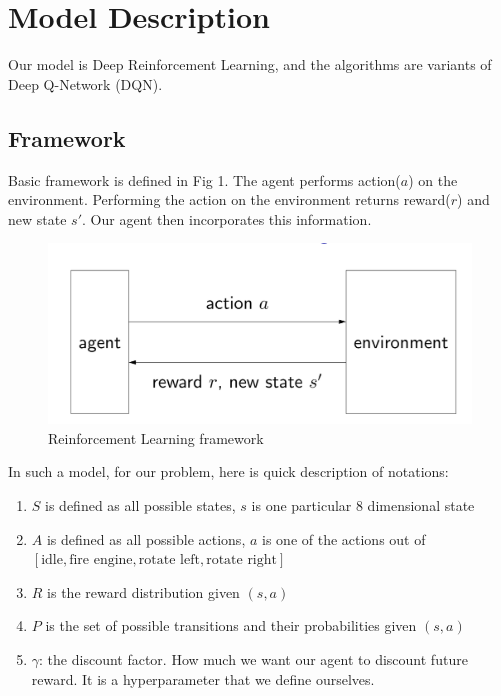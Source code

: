 \section{Model Description}
\label{sec:Model}

Our model is Deep Reinforcement Learning, and the algorithms are variants of Deep Q-Network (DQN).

\subsection{Framework}
Basic framework is defined in Fig 1. The agent performs action($a$) on the environment. Performing the action on the environment returns reward($r$) and new state $s'$. Our agent then incorporates this information.

\begin{figure}%
\centering
\includegraphics[scale=0.3]{reinforcement_framework.png}%
\caption{Reinforcement Learning framework}%
\label{fig:datastats}%
\end{figure}

In such a model, for our problem, here is quick description of notations:
\begin{enumerate}
\item $S$ is defined as all possible states, $s$ is one particular 8 dimensional state
\item $A$ is defined as all possible actions, $a$ is one of the actions out of $[\text{idle}, \text{fire engine}, \text{rotate left}, \text{rotate right}]$
\item $R$ is the reward distribution given $(s, a)$
\item $P$ is the set of possible transitions and their probabilities given $(s, a)$
\item $\gamma$: the discount factor. How much we want our agent to discount future reward. It is a hyperparameter that we define ourselves.
\end{enumerate}

